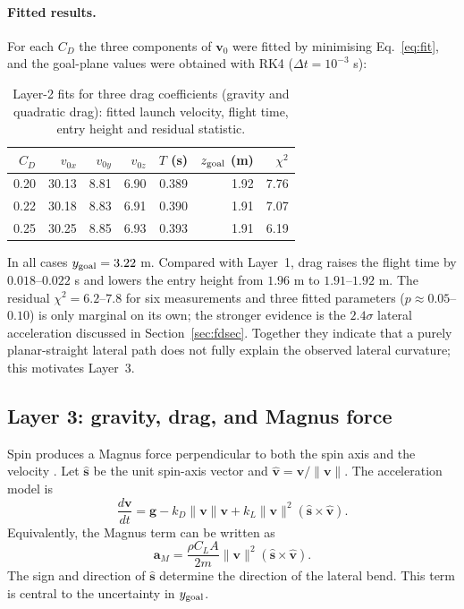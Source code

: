 \documentclass[11pt,a4paper]{article}
\begin{document}
\paragraph{Fitted results.}
For each $C_D$ the three components of $\bm v_0$ were fitted by minimising Eq.~\eqref{eq:fit}, and the goal-plane values were obtained with RK4 ($\Delta t=10^{-3}$ s):
\begin{table}[H]
\centering
\small
\caption{Layer-2 fits for three drag coefficients (gravity and quadratic drag): fitted launch velocity, flight time, entry height and residual statistic.}
\label{tab:layer2_fit}
\begin{tabular}{rrrrrrr}
\toprule
$C_D$ & $v_{0x}$ & $v_{0y}$ & $v_{0z}$ & $T$ (s) & $z_{\rm goal}$ (m) & $\chi^2$\\
\midrule
0.20 & 30.13 & 8.81 & 6.90 & 0.389 & 1.92 & 7.76\\
0.22 & 30.18 & 8.83 & 6.91 & 0.390 & 1.91 & 7.07\\
0.25 & 30.25 & 8.85 & 6.93 & 0.393 & 1.91 & 6.19\\
\bottomrule
\end{tabular}
\end{table}

In all cases $y_{\rm goal}=3.22$ m. Compared with Layer~1, drag raises the flight time by $0.018$--$0.022$ s and lowers the entry height from $1.96$ m to $1.91$--$1.92$ m. The residual $\chi^2=6.2$--$7.8$ for six measurements and three fitted parameters ($p\approx0.05$--$0.10$) is only marginal on its own; the stronger evidence is the $2.4\sigma$ lateral acceleration discussed in Section~\ref{sec:fdsec}. Together they indicate that a purely planar-straight lateral path does not fully explain the observed lateral curvature; this motivates Layer~3.



\subsection{Layer 3: gravity, drag, and Magnus force}
Spin produces a Magnus force perpendicular to both the spin axis and the velocity \citep{carre2002,goff2010}. Let $\hat{\bm s}$ be the unit spin-axis vector and $\hat{\bm v}=\bm v/\|\bm v\|$. The acceleration model is
\begin{equation}
    \frac{d\bm v}{dt}
    =\bm g-k_D\|\bm v\|\bm v
    +k_L\|\bm v\|^2(\hat{\bm s}\times\hat{\bm v}).
    \label{eq:magnus}
\end{equation}
Equivalently, the Magnus term can be written as
\begin{equation}
    \bm a_M=\frac{\rho C_L A}{2m}\|\bm v\|^2
    (\hat{\bm s}\times\hat{\bm v}).
\end{equation}
The sign and direction of $\hat{\bm s}$ determine the direction of the lateral bend. This term is central to the uncertainty in $y_{\rm goal}$.
\end{document}

